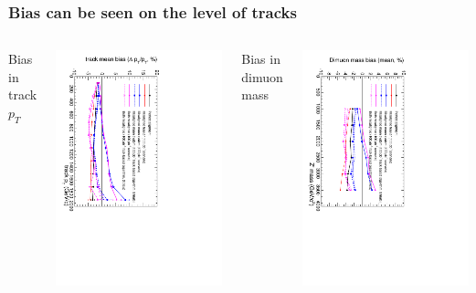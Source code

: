 \documentclass[compress]{beamer}
\begin{document}
\begin{frame}
\frametitle{Bias can be seen on the level of tracks}
\begin{columns}
\begin{center} Bias in track $p_T$ \end{center}

\vspace{-0.25 cm}
\includegraphics[height=\linewidth, angle=90]{ZSSM_Align_TrackBias_color-100.pdf}
\begin{center} Bias in dimuon mass \end{center}

\vspace{-0.25 cm}
\includegraphics[height=\linewidth, angle=90]{ZSSM_Align_MassBiasMean_color-100.pdf}
\end{columns}


\end{frame}
\end{document}
